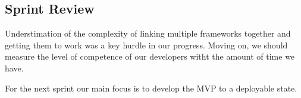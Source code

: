 \documentclass{article}
\begin{document}
\subsection{Sprint Review}
Understimation of the complexity of linking multiple frameworks together and getting them to work was a key hurdle in our progress. Moving on, we should measure the level of competence of our developers witht the amount of time we have.  

For the next sprint our main focus is to develop the MVP to a deployable state.
\end{document}
